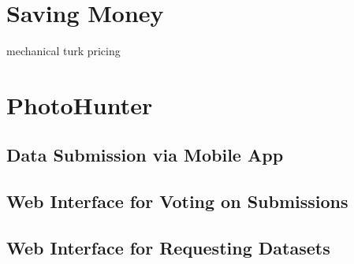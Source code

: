 \documentclass{article}
\begin{document}
\section{Saving Money}

mechanical turk pricing

\section{PhotoHunter}

\subsection{Data Submission via Mobile App}

\subsection{Web Interface for Voting on Submissions}

\subsection{Web Interface for Requesting Datasets}
\end{document}
